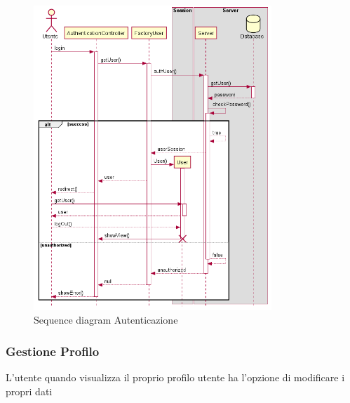 \documentclass[12pt, a4paper]{report}
\begin{document}
\begin{figure}[h]
  \centering
  \includegraphics[width=0.8\textwidth]{auth_sequence.png}
  \caption{Sequence diagram Autenticazione}
\end{figure}

\newpage

\subsubsection{Gestione Profilo}

L'utente quando visualizza il proprio profilo utente ha l'opzione di modificare
i propri dati
\end{document}
